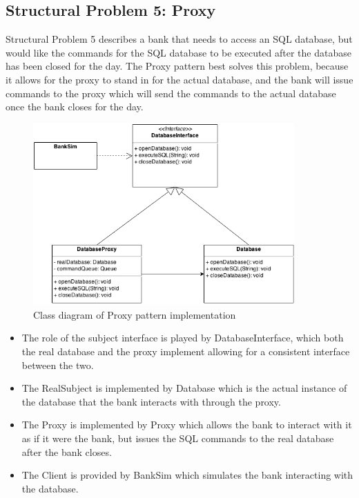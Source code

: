 \documentclass[12pt]{article}
\begin{document}
\newpage
\subsection{Structural Problem 5: Proxy}

Structural Problem 5 describes a bank that needs to access an SQL database, but
would like the commands for the SQL database to be executed after the database
has been closed for the day. The Proxy pattern best solves this problem, because
it allows for the proxy to stand in for the actual database, and the bank will 
issue commands to the proxy which will send the commands to the actual database
once the bank closes for the day.

\begin{figure}[!htb]
  \begin{center}
    \includegraphics[width=100mm]{Proxy.png}
    \caption{Class diagram of Proxy pattern implementation}
    \label{fig:proxy}
  \end{center} 
\end{figure}

\begin{itemize}
\item The role of the subject interface is played by 
  {\ttfamily DatabaseInterface}, which both the real database and the proxy 
  implement allowing for a consistent interface between the two. 
\item The RealSubject is implemented by {\ttfamily Database} which is the actual 
  instance of the database that the bank interacts with through the proxy.
\item The Proxy is implemented by {\ttfamily Proxy} which allows the bank to
  interact with it as if it were the bank, but issues the SQL commands to the
  real database after the bank closes.
\item The Client is provided by {\ttfamily BankSim} which simulates the bank
  interacting with the database.
\end{itemize}
\end{document}
